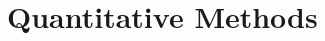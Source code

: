 \section{Quantitative Methods}



\newpage



\newpage



\newpage



\newpage



\newpage



\newpage






